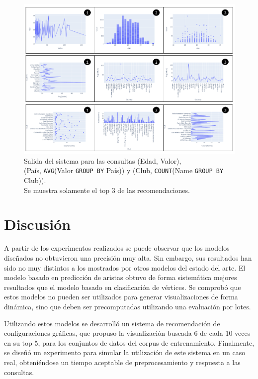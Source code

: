     \begin{figure}[h!]
        \centering
        \includegraphics[width=120mm]{Graphics/results.png}
        \caption{Salida del sistema para las consultas (Edad, Valor),\\
        (Pa\'is, \texttt{AVG}(Valor \texttt{GROUP BY} Pa\'is)) y (Club, \texttt{COUNT}(Name \texttt{GROUP BY} Club)).\\ Se muestra solamente el top 3 de las recomendaciones.}
        \label{fig: results}
    \end{figure}

    \section{Discusi\'on}

    A partir de los experimentos realizados se puede observar que los modelos dise\~nados no obtuvieron
    una precisi\'on muy alta. Sin embargo, sus resultados han sido no muy distintos a los mostrados por otros modelos
    del estado del arte. El modelo basado en predicci\'on de aristas obtuvo de forma sistem\'atica
    mejores resultados que el modelo basado en clasificaci\'on de v\'ertices. Se comprob\'o que estos modelos no pueden ser utilizados para generar
    visualizaciones de forma din\'amica, sino que deben ser precomputadas utilizando una evaluaci\'on
    por lotes.

    Utilizando estos modelos se desarroll\'o un sistema de recomendaci\'on de configuraciones gr\'aficas,
    que propuso la visualizaci\'on buscada 6 de cada 10 veces en su top 5, para los conjuntos de datos
    del corpus de entrenamiento. Finalmente, se dise\~n\'o un experimento para simular la utilizaci\'on
    de este sistema en un caso real, obteni\'endose un  tiempo aceptable de preprocesamiento y respuesta a las consultas.

